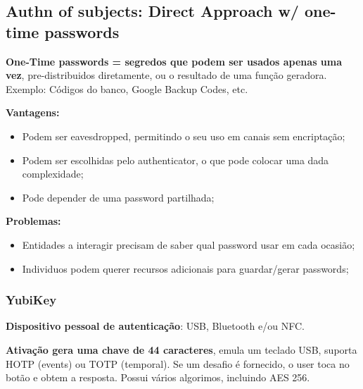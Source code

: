 \documentclass{article}
\begin{document}
\subsection{Authn of subjects: Direct Approach w/ one-time passwords}

\begin{flushleft}
  \textbf{One-Time passwords = segredos que podem ser usados apenas uma vez}, pre-distribuidos diretamente,
  ou o resultado de uma função geradora. Exemplo: Códigos do banco, Google Backup Codes, etc.


  \vspace{2mm}

  \textbf{Vantagens:}
  \begin{itemize}
    \item Podem ser eavesdropped, permitindo o seu uso em canais sem encriptação;
    \item Podem ser escolhidas pelo authenticator, o que pode colocar uma dada complexidade;
    \item Pode depender de uma password partilhada;
  \end{itemize}

  \vspace{2mm}

  \textbf{Problemas:}
  \begin{itemize}
    \item Entidades a interagir precisam de saber qual password usar em cada ocasião;
    \item Individuos podem querer recursos adicionais para guardar/gerar passwords;
  \end{itemize}
\end{flushleft}

\pagebreak

\subsubsection{YubiKey}

\begin{flushleft}
  \textbf{Dispositivo pessoal de autenticação}: USB, Bluetooth e/ou NFC.

  \vspace{2mm}

  \textbf{Ativação gera uma chave de 44 caracteres}, emula um teclado USB, suporta HOTP (events) ou TOTP (temporal).
  Se um desafio é fornecido, o user toca no botão e obtem a resposta. Possui vários algorimos, incluindo AES 256.
\end{flushleft}
\end{document}
